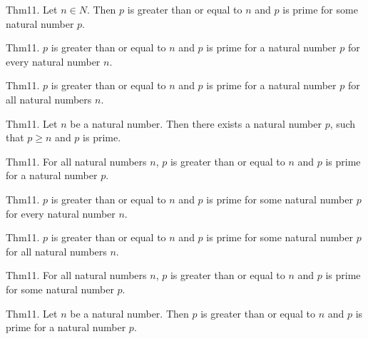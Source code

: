 \documentclass{article}
\begin{document}
Thm11. Let $n \in N$. Then $p$ is greater than or equal to $n$ and $p$ is prime for some natural number $p$.

Thm11. $p$ is greater than or equal to $n$ and $p$ is prime for a natural number $p$ for every natural number $n$.

Thm11. $p$ is greater than or equal to $n$ and $p$ is prime for a natural number $p$ for all natural numbers $n$.

Thm11. Let $n$ be a natural number. Then there exists a natural number $p$, such that $p \geq n$ and $p$ is prime.

Thm11. For all natural numbers $n$, $p$ is greater than or equal to $n$ and $p$ is prime for a natural number $p$.

Thm11. $p$ is greater than or equal to $n$ and $p$ is prime for some natural number $p$ for every natural number $n$.

Thm11. $p$ is greater than or equal to $n$ and $p$ is prime for some natural number $p$ for all natural numbers $n$.

Thm11. For all natural numbers $n$, $p$ is greater than or equal to $n$ and $p$ is prime for some natural number $p$.

Thm11. Let $n$ be a natural number. Then $p$ is greater than or equal to $n$ and $p$ is prime for a natural number $p$.
\end{document}

